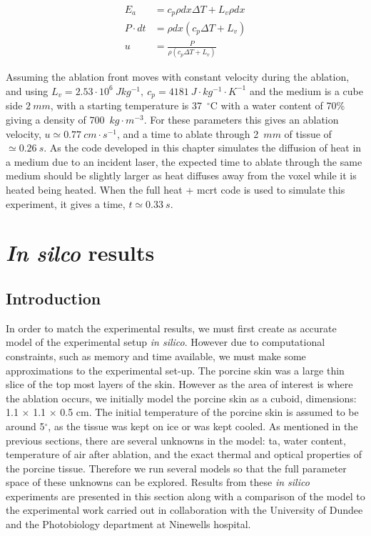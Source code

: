 \begin{align}
E_a &= c_p \rho dx \Delta T + L_v \rho dx \label{eqn:ablationenergy}\\
P\cdot dt &= \rho dx (c_p \Delta T + L_v) \label{eqn:midequationablation} \\
u &= \frac{P}{\rho(c_p\Delta T+ L_v)} \label{eqn:ablationvelo}
\end{align}

Assuming the ablation front moves with constant velocity during the ablation, and using $L_v=2.53\cdot 10^6\ J kg^{-1},\ c_p=4181\ J\cdot kg^{-1}\cdot K^{-1}$ and the medium is a cube side $2\ mm$, with a starting temperature is 37~$^{\circ}$C with a water content of 70\% giving a density of 700~$kg\cdot m^{-3}$. For these parameters this gives an ablation velocity, $u\simeq 0.77\ cm\cdot s^{-1}$, and a time to ablate through 2~$mm$ of tissue of $\simeq 0.26~s$.
As the code developed in this chapter simulates the diffusion of heat in a medium due to an incident laser, the expected time to ablate through the same medium should be slightly larger as heat diffuses away from the voxel while it is heated being heated. When the full heat + \gls{mcrt} code is used to simulate this experiment, it gives a time, $t \simeq 0.33~s$.	




\section{\textit{In silco} results} 

\subsection{Introduction}

In order to match the experimental results, we must first create as accurate model of the experimental setup \textit{in silico}. However due to computational constraints, such as memory and time available, we must make some approximations to the experimental set-up. The porcine skin was a large thin slice of the top most layers of the skin. However as the area of interest is where the ablation occurs, we initially  model the porcine skin as a cuboid, dimensions:  1.1 $\times$ 1.1 $\times$ 0.5 cm. The initial temperature of the porcine skin is assumed to be around 5$^{\circ}$, as the tissue was kept on ice or was kept cooled. 
As mentioned in the previous sections, there are several unknowns in the model: \gls{ta}, water content, temperature of air after ablation, and the exact thermal and optical properties of the porcine tissue. Therefore we run several models so that the full parameter space of these unknowns can be explored.
Results from these \textit{in silico} experiments are presented in this section along with a comparison of the model to the experimental work carried out in collaboration with the University of Dundee and the Photobiology department at Ninewells hospital.


